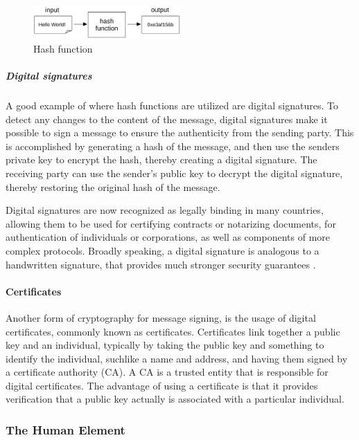 \begin{figure}[!h]
    \centering
    \includegraphics[width=0.5\textwidth]{../../img/chapter_2/hash-functions.jpg}
    \caption{Hash function}\label{fig:hash}
\end{figure}

\subparagraph{Digital signatures}
A good example of where hash functions are utilized are digital signatures. To detect any changes to the content of the message, digital signatures make it possible to sign a message to ensure the authenticity from the sending party. This is accomplished by generating a hash of the message, and then use the senders private key to encrypt the hash, thereby creating a digital signature. The receiving party can use the sender's public key to decrypt the digital signature, thereby restoring the original hash of the message.

Digital signatures are now recognized as legally binding in many countries, allowing them to be used for certifying contracts or notarizing documents, for authentication of individuals or corporations, as well as components of more complex protocols. Broadly speaking, a digital signature is analogous to a handwritten signature, that provides much stronger security guarantees \cite{katz2010digital}. 

\paragraph{Certificates}
Another form of cryptography for message signing, is the usage of digital certificates, commonly known as certificates. Certificates link together a public key and an individual, typically by taking the public key and something to identify the individual, suchlike a name and address, and having them signed by a certificate authority (CA). A CA is a trusted entity that is responsible for digital certificates. The advantage of using a certificate is that it provides verification that a public key actually is associated with a particular individual.


\subsubsection{The Human Element}

